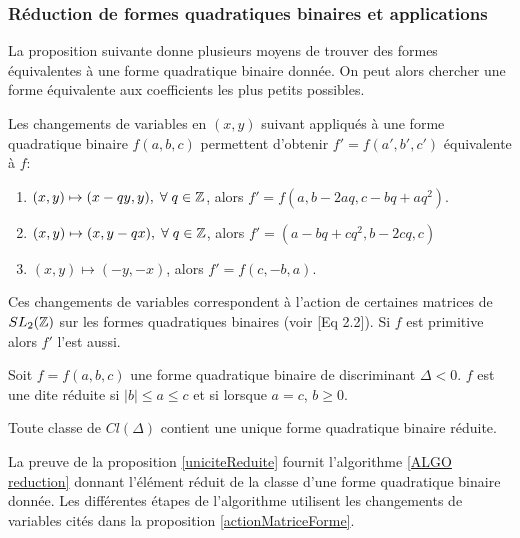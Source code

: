 \subsubsection{Réduction de formes quadratiques binaires et applications}


La proposition suivante donne plusieurs moyens de trouver des formes équivalentes à une forme quadratique binaire donnée. On peut alors chercher une forme équivalente aux coefficients les plus petits possibles. 

\begin{Prop}\label{actionMatriceForme}
	Les changements de variables en $(x,y)$ suivant appliqués à une forme quadratique binaire $f(a,b,c)$ permettent d'obtenir $f' = f(a',b',c')$ équivalente à $f$:
	\begin{enumerate}
		\item $(x,y)\mapsto (x - qy, y),\;\forall\;q\in\mathbb{Z}$, alors $f' = f(a,b - 2aq, c - bq + aq^2)$.
		\item $(x,y)\mapsto (x, y - qx),\;\forall\;q\in\mathbb{Z}$, alors $f' = (a - bq + cq^2, b - 2cq, c)$
		\item $(x,y)\mapsto(-y,-x)$, alors $f' = f(c, -b, a) $.
	\end{enumerate}
	Ces changements de variables correspondent à l'action de certaines matrices de $SL_{2}(\mathbb{Z})$ sur les formes quadratiques binaires (voir \cite{Cox}[Eq 2.2]). Si $f$ est primitive alors $f'$ l'est aussi. 
\end{Prop}

\begin{Def}
	Soit $f = f(a,b,c)$ une forme quadratique binaire de discriminant $\Delta < 0$. $f$ est une dite réduite si $|b| \leq a \leq c$ et si lorsque $a = c$, $b \geq 0$. 
\end{Def}

\begin{Prop}\label{uniciteReduite}
	 Toute classe de $Cl(\Delta)$ contient une unique forme quadratique binaire réduite. 
\end{Prop}

La preuve de la proposition \ref{uniciteReduite} fournit l'algorithme \ref{ALGO reduction} donnant l'élément réduit de la classe d'une forme quadratique binaire donnée. Les différentes étapes de l'algorithme utilisent les changements de variables cités dans la proposition \ref{actionMatriceForme}. 

